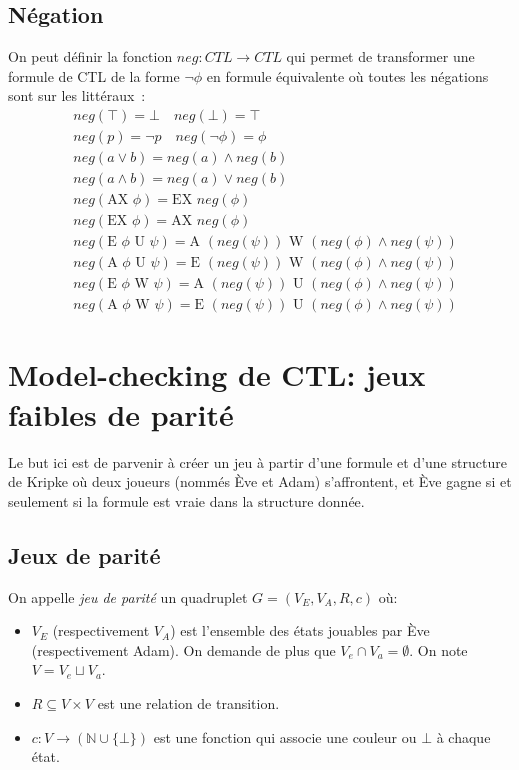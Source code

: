 \documentclass[10pt,a4paper]{article}
\begin{document}
\subsection{Négation}
On peut définir la fonction $neg:CTL \to CTL$ qui permet de transformer une formule de CTL de la forme $\neg \phi$ en formule équivalente où toutes les négations sont sur les littéraux :
\begin{align*}
&neg(\top) = \bot \quad neg(\bot) = \top\\
&neg(p) = \neg p \quad neg(\neg \phi) = \phi\\
&neg(a \lor b) = neg(a) \land neg(b)\\
&neg(a \land b) = neg(a) \lor neg(b)\\
&neg(\mbox{AX } \phi) = \mbox{EX }neg(\phi)\\
&neg(\mbox{EX } \phi) = \mbox{AX }neg(\phi)\\
&neg(\mbox{E } \phi \mbox{ U } \psi) =\mbox{A } (neg(\psi)) \mbox{ W } (neg(\phi) \land neg(\psi))\\
&neg(\mbox{A } \phi \mbox{ U } \psi) =\mbox{E } (neg(\psi)) \mbox{ W } (neg(\phi) \land neg(\psi))\\
&neg(\mbox{E } \phi \mbox{ W } \psi) =\mbox{A } (neg(\psi)) \mbox{ U } (neg(\phi) \land neg(\psi))\\
&neg(\mbox{A } \phi \mbox{ W } \psi) =\mbox{E } (neg(\psi)) \mbox{ U } (neg(\phi) \land neg(\psi))
\end{align*}

\section{Model-checking de CTL: jeux faibles de parité}
Le but ici est de parvenir à créer un jeu à partir d'une formule et d'une structure de Kripke où deux joueurs (nommés Ève et Adam) s'affrontent, et Ève gagne si et seulement si la formule est vraie dans la structure donnée.

\subsection{Jeux de parité}
On appelle \emph{jeu de parité} un quadruplet $G = (V_E, V_A, R, c)$ où:
\begin{itemize}
\item $V_E$ (respectivement $V_A$) est l'ensemble des états jouables par Ève (respectivement Adam). On demande de plus que $V_e \cap V_a = \emptyset$. On note $V = V_e \sqcup V_a$.
\item $R \subseteq V \times V$ est une relation de transition.
\item $c : V \to (\mathbb{N} \cup \{\bot\})$ est une fonction qui associe une couleur ou $\bot$ à chaque état.
\end{itemize}
\end{document}

